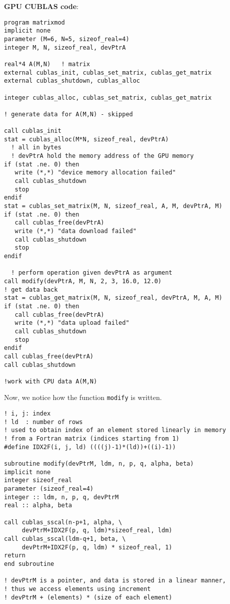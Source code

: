 {\bf GPU CUBLAS code}:
\begin{lstlisting}
program matrixmod
implicit none
parameter (M=6, N=5, sizeof_real=4)
integer M, N, sizeof_real, devPtrA

real*4 A(M,N)   ! matrix
external cublas_init, cublas_set_matrix, cublas_get_matrix
external cublas_shutdown, cublas_alloc

integer cublas_alloc, cublas_set_matrix, cublas_get_matrix

! generate data for A(M,N) - skipped

call cublas_init
stat = cublas_alloc(M*N, sizeof_real, devPtrA)
  ! all in bytes
  ! devPtrA hold the memory address of the GPU memory
if (stat .ne. 0) then 
   write (*,*) "device memory allocation failed"
   call cublas_shutdown
   stop
endif
stat = cublas_set_matrix(M, N, sizeof_real, A, M, devPtrA, M)
if (stat .ne. 0) then
   call cublas_free(devPtrA)
   write (*,*) "data download failed"
   call cublas_shutdown
   stop
endif

  ! perform operation given devPtrA as argument
call modify(devPtrA, M, N, 2, 3, 16.0, 12.0)
! get data back
stat = cublas_get_matrix(M, N, sizeof_real, devPtrA, M, A, M)
if (stat .ne. 0) then
   call cublas_free(devPtrA)
   write (*,*) "data upload failed"
   call cublas_shutdown
   stop
endif
call cublas_free(devPtrA)
call cublas_shutdown

!work with CPU data A(M,N)
\end{lstlisting}

Now, we notice how the function \verb!modify! is written.
\begin{lstlisting}
! i, j: index
! ld  : number of rows
! used to obtain index of an element stored linearly in memory
! from a Fortran matrix (indices starting from 1)
#define IDX2F(i, j, ld) ((((j)-1)*(ld))+((i)-1))

subroutine modify(devPtrM, ldm, n, p, q, alpha, beta)
implicit none
integer sizeof_real
parameter (sizeof_real=4)
integer :: ldm, n, p, q, devPtrM
real :: alpha, beta

call cublas_sscal(n-p+1, alpha, \
     devPtrM+IDX2F(p, q, ldm)*sizeof_real, ldm)
call cublas_sscal(ldm-q+1, beta, \
     devPtrM+IDX2F(p, q, ldm) * sizeof_real, 1)
return
end subroutine

! devPtrM is a pointer, and data is stored in a linear manner, 
! thus we access elements using increment 
! devPtrM + (elements) * (size of each element)
\end{lstlisting}

 

